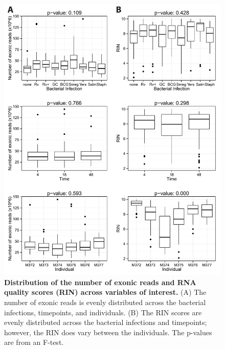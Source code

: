 \begin{figure}[htbp]
\centering
\includegraphics[width=5in]{img/ch02/fig-S09-rin-and-reads.pdf}
\caption[Distribution of the number of exonic reads and RNA quality
  scores (RIN) across variables of interest.]{\textbf{Distribution of
    the number of exonic reads and RNA quality scores (RIN) across
    variables of interest.} (A) The number of exonic reads is evenly
  distributed across the bacterial infections, timepoints, and
  individuals. (B) The RIN scores are evenly distributed across the
  bacterial infections and timepoints; however, the RIN does vary
  between the individuals.  The p-values are from an F-test.}
\label{fig:rin-and-reads}
\end{figure}

